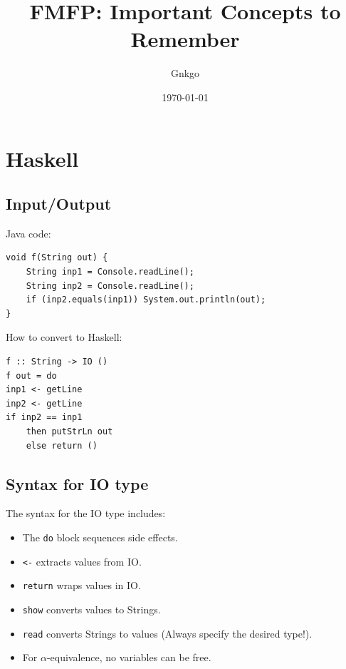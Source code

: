 \documentclass{article}
\begin{document}
\title{FMFP: Important Concepts to Remember}
\author{Gnkgo}
\date{\today}

\maketitle
\clearpage %

\tableofcontents 
\clearpage %


\section{Haskell}

\subsection{Input/Output}

Java code:

\begin{lstlisting}[style=javastyle, caption=Java Code, label=code:java]
void f(String out) {
    String inp1 = Console.readLine();
    String inp2 = Console.readLine();
    if (inp2.equals(inp1)) System.out.println(out);
}
\end{lstlisting}
How to convert to Haskell:
\begin{lstlisting}[style=haskellstyle, caption=Haskell Code, label=code:haskell]
f :: String -> IO ()
f out = do
inp1 <- getLine
inp2 <- getLine
if inp2 == inp1
    then putStrLn out
    else return ()
\end{lstlisting}

\subsection{Syntax for IO type}

The syntax for the IO type includes:
\begin{itemize}
    \item The \texttt{do} block sequences side effects.
    \item \texttt{<-} extracts values from IO.
    \item \texttt{return} wraps values in IO.
    \item \texttt{show} converts values to Strings.
    \item \texttt{read} converts Strings to values (Always specify the desired type!).
    \item For $\alpha$-equivalence, no variables can be free.
\end{itemize}
\end{document}

